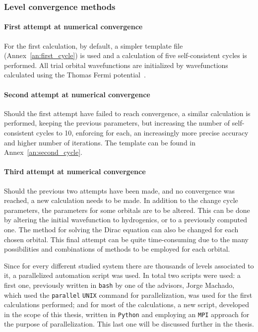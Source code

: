\subsubsection{Level convergence methods}

\paragraph{First attempt at numerical convergence}
For the first calculation, by default, a simpler template file (Annex~\ref{an:first_cycle}) is used and a calculation of five self-consistent cycles is performed. All  trial orbital wavefunctions are initialized by wavefunctions calculated using the Thomas Fermi potential~\cite{thomas_1927}.





\paragraph{Second attempt at numerical convergence}
Should the first attempt have failed to reach convergence, a similar calculation is performed, keeping the previous parameters, but increasing the number of self-consistent cycles to 10, enforcing for each, an increasingly more precise accuracy and higher number of iterations. The template can be found in Annex~\ref{an:second_cycle}.


\paragraph{Third attempt at numerical convergence}
Should the previous two attempts have been made, and no convergence was reached, a new calculation needs to be made. In addition to the change cycle parameters, the parameters for some orbitals are to be altered. This can be done by altering the initial wavefunction to hydrogenics, or to a previously computed one. The method for solving the Dirac equation can also be changed for each chosen orbital. This final attempt can be quite time-consuming due to the many possibilities and combinations of methods to be employed for each orbital.


Since for every different studied system there are thousands of levels associated to it, a parallelized automation script was used. In total two scripts were used: a first one, previously written in \verb|bash| by one of the advisors, Jorge Machado, which used the \verb|parallel| \verb|UNIX| command  for parallelization, was used for the first calculations performed; and for most of the calculations, a new script, developed in the scope of this thesis, written in \verb|Python| and employing an \verb|MPI| approach for the purpose of parallelization. This last one will be discussed further in the thesis.

